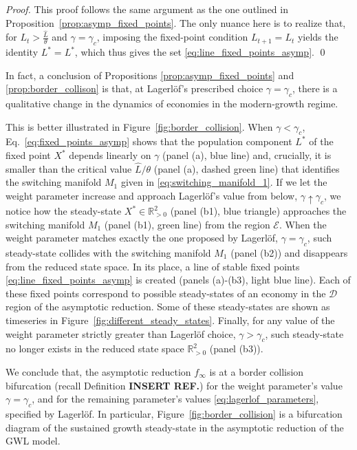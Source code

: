 \documentclass[a4paper,fleqn]{cas-sc}
\begin{document}
%
\begin{proof}
    This proof follows the same argument as the one outlined in Proposition~\ref{prop:asymp_fixed_points}. The only nuance here is to realize that, for $L_t>\frac{\hat L}{\theta}$ and $\gamma=\gamma_c$, imposing the fixed-point condition $L_{t+1}=L_t$ yields the identity $L^*=L^*$, which thus gives the set \eqref{eq:line_fixed_points_asymp}.
    \qed
\end{proof}
%
In fact, a conclusion of Propositions \ref{prop:asymp_fixed_points} and \ref{prop:border_collison} is that, at Lagerl\"{o}f's prescribed choice $\gamma=\gamma_c$, there is a qualitative change in the dynamics of economies in the modern-growth regime.

This is better illustrated in Figure~\ref{fig:border_collision}.
When $\gamma<\gamma_c$, Eq.~\eqref{eq:fixed_points_asymp} shows that the population component $L^*$ of the fixed point $X^*$ depends linearly on $\gamma$ (panel (a), blue line) and, crucially, it is smaller than the critical value $\hat L/\theta$ (panel (a), dashed green line) that identifies the switching manifold $M_1$ given in \eqref{eq:switching_manifold_1}.
If we let the weight parameter increase and approach Lagerl\"{o}f's value from below, $\gamma \uparrow \gamma_c$, we notice how the steady-state $X^*\in\mathbb R^2_{>0}$ (panel (b1), blue triangle) approaches the switching manifold $M_1$ (panel (b1), green line) from the region $\mathcal E$.
When the weight parameter matches exactly the one proposed by Lagerl\"{o}f, $\gamma = \gamma_c$, such steady-state collides with the switching manifold $M_1$ (panel (b2)) and disappears from the reduced state space.
In its place, a line of stable fixed points \eqref{eq:line_fixed_points_asymp} is created (panels (a)-(b3), light blue line).
Each of these fixed points correspond to possible steady-states of an economy in the $\mathcal D$ region of the asymptotic reduction.
Some of these steady-states are shown as timeseries in Figure~\ref{fig:different_steady_states}.
Finally, for any value of the weight parameter strictly greater than Lagerl\"{o}f choice, $\gamma > \gamma_c$, such steady-state no longer exists in the reduced state space $\mathbb R^2_{>0}$ (panel (b3)).

We conclude that, the asymptotic reduction $f_{\infty}$ is at a border collision bifurcation (recall Definition \textbf{INSERT REF.}) for the weight parameter's value $\gamma=\gamma_c$, and for the remaining parameter's values \eqref{eq:lagerlof_parameters}, specified by Lagerl\"{o}f.
In particular, Figure~\ref{fig:border_collision} is a bifurcation diagram of the sustained growth steady-state in the asymptotic reduction of the GWL model.
\end{document}
